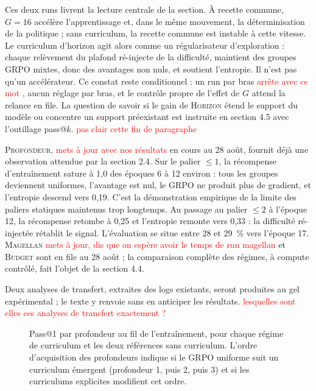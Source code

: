 \documentclass[11pt,a4paper]{article}
\begin{document}
Ces deux runs livrent la lecture centrale de la section. À recette commune, $G=16$ accélère l'apprentissage et, dans le même mouvement, la déterminisation de la politique ; sans curriculum, la recette commune est instable à cette vitesse. Le curriculum d'horizon agit alors comme un régularisateur d'exploration : chaque relèvement du plafond ré-injecte de la difficulté, maintient des groupes GRPO mixtes, donc des avantages non nuls, et soutient l'entropie. Il n'est pas qu'un accélérateur. Ce constat reste conditionnel : un run par bras \textcolor{red}{arrête avec ce mot} , aucun réglage par bras, et le contrôle propre de l'effet de $G$ attend la relance en file. La question de savoir si le gain de \textsc{Horizon} étend le support du modèle ou concentre un support préexistant est instruite en section 4.5 avec l'outillage pass@$k$. \textcolor{red}{pas clair cette fin de paragraphe} 

\textsc{Profondeur}, \textcolor{red}{mets à jour avec nos résultats} en cours au 28 août, fournit déjà une observation attendue par la section 2.4. Sur le palier $\leq 1$, la récompense d'entraînement sature à 1{,}0 des époques 6 à 12 environ : tous les groupes deviennent uniformes, l'avantage est nul, le GRPO ne produit plus de gradient, et l'entropie descend vers 0{,}19. C'est la démonstration empirique de la limite des paliers statiques maintenus trop longtemps. Au passage au palier $\leq 2$ à l'époque 12, la récompense retombe à 0{,}25 et l'entropie remonte vers 0{,}33 : la difficulté ré-injectée rétablit le signal. L'évaluation se situe entre 28 et 29~\% vers l'époque 17. \textsc{Magellan} \textcolor{red}{mets à jour, dis que on espère avoir le temps de run magellan} et \textsc{Budget} sont en file au 28 août ; la comparaison complète des régimes, à compute contrôlé, fait l'objet de la section 4.4.

Deux analyses de transfert, extraites des logs existants, seront produites au gel expérimental ; le texte y renvoie sans en anticiper les résultats. \textcolor{red}{lesquelles sont elles ces analyses de transfert exactement ? } 

\begin{figure}[htbp]
  \centering
  \caption{Pass@1 par profondeur au fil de l'entraînement, pour chaque régime de curriculum et les deux références sans curriculum. L'ordre d'acquisition des profondeurs indique si le GRPO uniforme suit un curriculum émergent (profondeur 1, puis 2, puis 3) et si les curriculums explicites modifient cet ordre.}
  \label{fig:acquisition_depths}
\end{figure}
\end{document}
